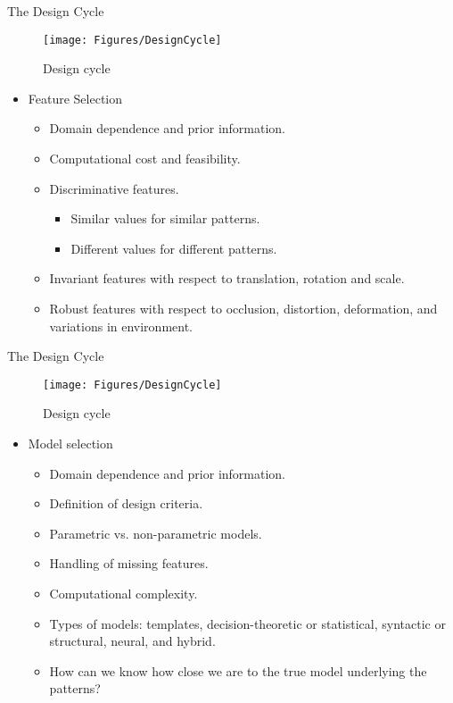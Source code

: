 \begin{frame}{The Design Cycle}
\begin{figure}
\texttt{[image: Figures/DesignCycle]}
\caption{Design cycle}
\end{figure}
\vspace{-20pt}
\begin{itemize}
\setlength{\itemsep}{12pt}
\item {\color{mycolor2}Feature Selection}
\begin{itemize}
\item Domain dependence and prior information.
\item Computational cost and feasibility.
\item Discriminative features.
\begin{itemize}
\item Similar values for similar patterns.
\item Different values for different patterns.
\end{itemize}
\item Invariant features with respect to translation, rotation and
scale.
\item Robust features with respect to occlusion, distortion,
deformation, and variations in environment.
\end{itemize}
\end{itemize}
\end{frame}

\begin{frame}{The Design Cycle}
\begin{figure}
\texttt{[image: Figures/DesignCycle]}
\caption{Design cycle}
\end{figure}
\vspace{-20pt}
\begin{itemize}
\item {\color{mycolor2}Model selection}
\begin{itemize}
\item Domain dependence and prior information.
\item Definition of design criteria.
\item Parametric vs. non-parametric models.
\item Handling of missing features.
\item Computational complexity.
\item Types of models: templates, decision-theoretic or statistical, syntactic or structural, neural, and hybrid.
\item How can we know how close we are to the true model underlying the patterns?
\end{itemize}
\end{itemize}
\end{frame}

